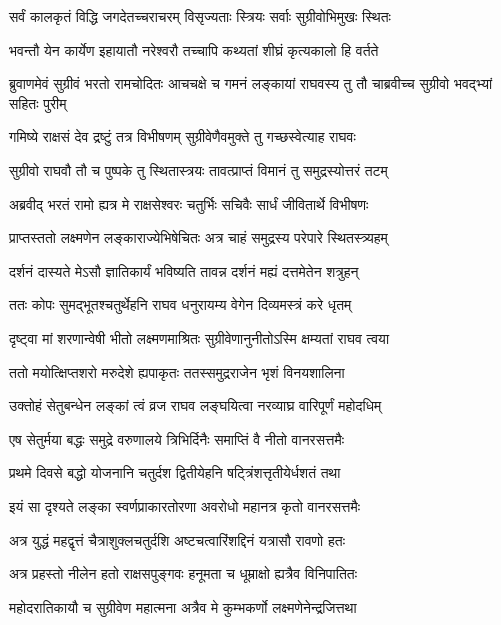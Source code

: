 \twolineshloka
{सर्वं कालकृतं विद्धि जगदेतच्चराचरम्}
{विसृज्यताः स्त्रियः सर्वाः सुग्रीवोभिमुखः स्थितः}%


\twolineshloka
{भवन्तौ येन कार्येण इहायातौ नरेश्वरौ}
{तच्चापि कथ्यतां शीघ्रं कृत्यकालो हि वर्तते}%


\threelineshloka
{ब्रुवाणमेवं सुग्रीवं भरतो रामचोदितः}
{आचचक्षे च गमनं लङ्कायां राघवस्य तु}
{तौ चाब्रवीच्च सुग्रीवो भवद्भ्यां सहितः पुरीम्}%

\twolineshloka
{गमिष्ये राक्षसं देव द्रष्टुं तत्र विभीषणम्}
{सुग्रीवेणैवमुक्ते तु गच्छस्वेत्याह राघवः}%

\twolineshloka
{सुग्रीवो राघवौ तौ च पुष्पके तु स्थितास्त्रयः}
{तावत्प्राप्तं विमानं तु समुद्रस्योत्तरं तटम्}%

\twolineshloka
{अब्रवीद् भरतं रामो ह्यत्र मे राक्षसेश्वरः}
{चतुर्भिः सचिवैः सार्धं जीवितार्थे विभीषणः}%

\twolineshloka
{प्राप्तस्ततो लक्ष्मणेन लङ्काराज्येभिषेचितः}
{अत्र चाहं समुद्रस्य परेपारे स्थितस्त्र्यहम्}%

\twolineshloka
{दर्शनं दास्यते मेऽसौ ज्ञातिकार्यं भविष्यति}
{तावन्न दर्शनं मह्यं दत्तमेतेन शत्रुहन्}%

\twolineshloka
{ततः कोपः सुमद्भूतश्चतुर्थेहनि राघव}
{धनुरायम्य वेगेन दिव्यमस्त्रं करे धृतम्}%

\twolineshloka
{दृष्ट्वा मां शरणान्वेषी भीतो लक्ष्मणमाश्रितः}
{सुग्रीवेणानुनीतोऽस्मि क्षम्यतां राघव त्वया}%

\twolineshloka
{ततो मयोत्क्षिप्तशरो मरुदेशे ह्यपाकृतः}
{ततस्समुद्रराजेन भृशं विनयशालिना}%

\twolineshloka
{उक्तोहं सेतुबन्धेन लङ्कां त्वं व्रज राघव}
{लङ्घयित्वा नरव्याघ्र वारिपूर्णं महोदधिम्}%

\twolineshloka
{एष सेतुर्मया बद्धः समुद्रे वरुणालये}
{त्रिभिर्दिनैः समाप्तिं वै नीतो वानरसत्तमैः}%

\twolineshloka
{प्रथमे दिवसे बद्धो योजनानि चतुर्दश}
{द्वितीयेहनि षट्त्रिंशत्तृतीयेर्धशतं तथा}%

\twolineshloka
{इयं सा दृश्यते लङ्का स्वर्णप्राकारतोरणा}
{अवरोधो महानत्र कृतो वानरसत्तमैः}%

\twolineshloka
{अत्र युद्धं महद्वृत्तं चैत्राशुक्लचतुर्दशि}
{अष्टचत्वारिंशद्दिनं यत्रासौ रावणो हतः}%

\twolineshloka
{अत्र प्रहस्तो नीलेन हतो राक्षसपुङ्गवः}
{हनूमता च धूम्राक्षो ह्यत्रैव विनिपातितः}%

\twolineshloka
{महोदरातिकायौ च सुग्रीवेण महात्मना}
{अत्रैव मे कुम्भकर्णो लक्ष्मणेनेन्द्रजित्तथा}%

